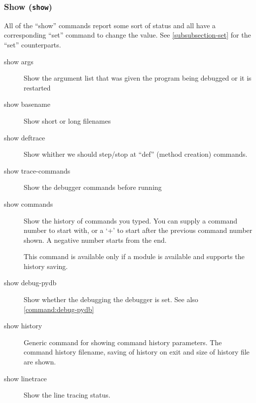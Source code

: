 \subsubsection{Show ({\tt show}) \label{subsubsection-show}}

All of the ``show'' commands report some sort of status and all have a
corresponding ``set'' command to change the value. See
\ref{subsubsection-set} for the ``set'' counterparts.

\begin{description}

\item[show args]

Show the argument list that was given the program being debugged or it is
restarted

\item[show basename]

Show short or long filenames

\item[show deftrace]

Show whither we should step/stop at ``def'' (method creation) commands.

\item[show trace-commands]

Show the debugger commands before running

\item[show commands]

Show the history of commands you typed. You can supply a command
number to start with, or a `+' to start after the previous command
number shown.  A negative number starts from the end.

This command is available only if a
module is available and supports the history saving.

\item[show debug-pydb]

Show whether the debugging the debugger is set.
See also \ref{command:debug-pydb}

\item[show history]

Generic command for showing command history parameters. The command
history filename, saving of history on exit and size of history file
are shown.

\item[show linetrace]

Show the line tracing status.


\end{description}
